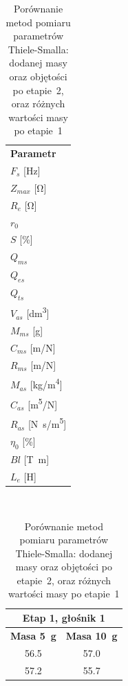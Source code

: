 \documentclass[12pt]{oska}
\begin{document}
	\begin{table}[!ht]
		\centering
		\caption{Porównanie metod pomiaru parametrów Thiele-Smalla: dodanej masy oraz objętości po etapie~2, oraz różnych wartości masy po etapie~1}
		\label{t:TS_metody}
		\boldmath
		\begin{tabular}{|l|}
			\hline
			\multirow{2}{*}{\textbf{Parametr}} 	\\
			\\\hline
			\hline                              							
			$F_s$ [\si{\hertz}] \\\hline
			$Z_{max}$ [\si{\ohm}] \\\hline
			$R_e$ [\si{\ohm}] \\\hline
			$r_0$ \\\hline
			$S$ [\%]\\\hline
			\hline                              							
			$Q_{ms}$ 	\\\hline
			$Q_{es}$ \\\hline	
			$Q_{ts}$ \\\hline
			\hline                                                  		
			$V_{as}$ [\si{\deci\metre\cubed}] \\\hline
			$M_{ms}$ [\si{\gram}] 	\\\hline
			$C_{ms}$ [\si[per-mode=symbol]{\metre\per\newton}] 	\\\hline
			$R_{ms}$ [\si[per-mode=symbol]{\metre\per\newton}] 	\\\hline
			\hline
			$M_{as}$ [\si[per-mode=symbol]{\kilo\gram\per\metre\tothe{4}}] 	\\\hline
			$C_{as}$ [\si[per-mode=symbol]{\metre\tothe{5}\per\newton}] \\\hline	
			$R_{as}$ [\si[per-mode=symbol]{\newton\s\per\metre\tothe{5}}] 	\\\hline
			\hline
			$\eta_0$ [\%] 	\\\hline
			$Bl$ [\si{\tesla\metre}]	\\\hline
			$L_{e}$ [\si{\henry}] 	\\\hline
		\end{tabular}
		\unboldmath
		~ \quad
		\begin{tabular}{|c|c|}
			\hline
			\multicolumn{2}{|c|}{\textbf{Etap 1, głośnik 1}} \\\hline
			\textbf{Masa \SI{5}{\gram}} & \textbf{Masa \SI{10}{\gram}} \\\hline
			\hline
			\num{56,5} 	& \num{57,0} 	 \\\hline
			\num{57,2} 	& \num{55,7} 	 \\\hline

\end{tabular}
\end{table}
\end{document}
